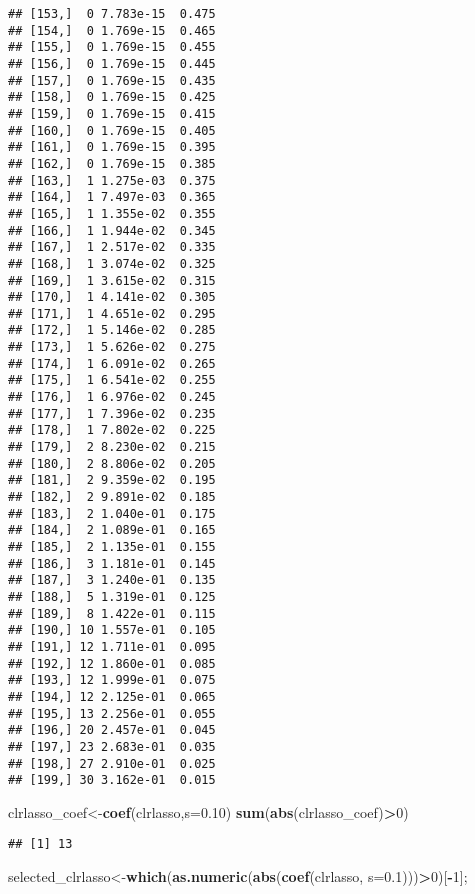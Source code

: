 \documentclass[]{book}
\newenvironment{Shaded}{\begin{snugshade}}{\end{snugshade}}
\newcommand{\KeywordTok}[1]{\textcolor[rgb]{0.13,0.29,0.53}{\textbf{#1}}}
\newcommand{\DataTypeTok}[1]{\textcolor[rgb]{0.13,0.29,0.53}{#1}}
\newcommand{\DecValTok}[1]{\textcolor[rgb]{0.00,0.00,0.81}{#1}}
\newcommand{\FloatTok}[1]{\textcolor[rgb]{0.00,0.00,0.81}{#1}}
\newcommand{\OperatorTok}[1]{\textcolor[rgb]{0.81,0.36,0.00}{\textbf{#1}}}
\newcommand{\NormalTok}[1]{#1}
\begin{document}
\begin{verbatim}
## [153,]  0 7.783e-15  0.475
## [154,]  0 1.769e-15  0.465
## [155,]  0 1.769e-15  0.455
## [156,]  0 1.769e-15  0.445
## [157,]  0 1.769e-15  0.435
## [158,]  0 1.769e-15  0.425
## [159,]  0 1.769e-15  0.415
## [160,]  0 1.769e-15  0.405
## [161,]  0 1.769e-15  0.395
## [162,]  0 1.769e-15  0.385
## [163,]  1 1.275e-03  0.375
## [164,]  1 7.497e-03  0.365
## [165,]  1 1.355e-02  0.355
## [166,]  1 1.944e-02  0.345
## [167,]  1 2.517e-02  0.335
## [168,]  1 3.074e-02  0.325
## [169,]  1 3.615e-02  0.315
## [170,]  1 4.141e-02  0.305
## [171,]  1 4.651e-02  0.295
## [172,]  1 5.146e-02  0.285
## [173,]  1 5.626e-02  0.275
## [174,]  1 6.091e-02  0.265
## [175,]  1 6.541e-02  0.255
## [176,]  1 6.976e-02  0.245
## [177,]  1 7.396e-02  0.235
## [178,]  1 7.802e-02  0.225
## [179,]  2 8.230e-02  0.215
## [180,]  2 8.806e-02  0.205
## [181,]  2 9.359e-02  0.195
## [182,]  2 9.891e-02  0.185
## [183,]  2 1.040e-01  0.175
## [184,]  2 1.089e-01  0.165
## [185,]  2 1.135e-01  0.155
## [186,]  3 1.181e-01  0.145
## [187,]  3 1.240e-01  0.135
## [188,]  5 1.319e-01  0.125
## [189,]  8 1.422e-01  0.115
## [190,] 10 1.557e-01  0.105
## [191,] 12 1.711e-01  0.095
## [192,] 12 1.860e-01  0.085
## [193,] 12 1.999e-01  0.075
## [194,] 12 2.125e-01  0.065
## [195,] 13 2.256e-01  0.055
## [196,] 20 2.457e-01  0.045
## [197,] 23 2.683e-01  0.035
## [198,] 27 2.910e-01  0.025
## [199,] 30 3.162e-01  0.015
\end{verbatim}

\begin{Shaded}
\begin{Highlighting}[]
\NormalTok{clrlasso_coef<-}\KeywordTok{coef}\NormalTok{(clrlasso,}\DataTypeTok{s=}\FloatTok{0.10}\NormalTok{)}
\KeywordTok{sum}\NormalTok{(}\KeywordTok{abs}\NormalTok{(clrlasso_coef)}\OperatorTok{>}\DecValTok{0}\NormalTok{)}
\end{Highlighting}
\end{Shaded}

\begin{verbatim}
## [1] 13
\end{verbatim}

\begin{Shaded}
\begin{Highlighting}[]
\NormalTok{selected_clrlasso<-}\KeywordTok{which}\NormalTok{(}\KeywordTok{as.numeric}\NormalTok{(}\KeywordTok{abs}\NormalTok{(}\KeywordTok{coef}\NormalTok{(clrlasso, }\DataTypeTok{s=}\FloatTok{0.1}\NormalTok{)))}\OperatorTok{>}\DecValTok{0}\NormalTok{)[}\OperatorTok{-}\DecValTok{1}\NormalTok{]; }
\end{Highlighting}
\end{Shaded}
\end{document}
